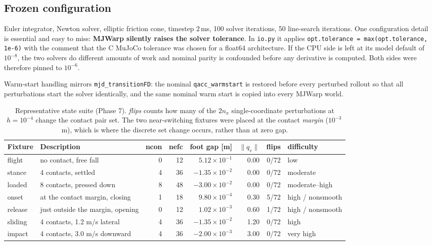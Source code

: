 \documentclass[11pt,a4paper]{article}
\newcommand{\code}[1]{\texttt{\small #1}}
\begin{document}
\subsection{Frozen configuration}
Euler integrator, Newton solver, elliptic friction cone, timestep $2$\,ms, 100 solver
iterations, 50 line-search iterations. One configuration detail is essential and easy to
miss: \textbf{MJWarp silently raises the solver tolerance}. In \code{io.py} it applies
\code{opt.tolerance = max(opt.tolerance, 1e-6)} with the comment that the C MuJoCo tolerance
was chosen for a float64 architecture. If the CPU side is left at its model default of
$10^{-8}$, the two solvers do different amounts of work and nominal parity is confounded
before any derivative is computed. Both sides were therefore pinned to $10^{-6}$.

Warm-start handling mirrors \code{mjd\_transitionFD}: the nominal \code{qacc\_warmstart} is
restored before every perturbed rollout so that all perturbations start the solver
identically, and the same nominal warm start is copied into every MJWarp world.

\begin{table}[htbp]
\centering
\footnotesize
\caption{Representative state suite (Phase 7). \emph{flips} counts how many of the $2n_x$ single-coordinate perturbations at $h=10^{-4}$ change the contact pair set. The two near-switching fixtures were placed at the contact \emph{margin} ($10^{-3}$\,m), which is where the discrete set change occurs, rather than at zero gap.}
\label{tab:fixtures}
\begin{tabular}{llrrrrrl}
\toprule
\textbf{Fixture} & \textbf{Description} & \textbf{ncon} & \textbf{nefc} & \textbf{foot gap [m]} & $\|q_v\|$ & \textbf{flips} & \textbf{difficulty} \\
\midrule
flight & no contact, free fall & 0 & 12 & $5.12\times10^{-1}$ & 0.00 & 0/72 & low \\
stance & 4 contacts, settled & 4 & 36 & $-1.35\times10^{-2}$ & 0.00 & 0/72 & moderate \\
loaded & 8 contacts, pressed down & 8 & 48 & $-3.00\times10^{-2}$ & 0.00 & 0/72 & moderate--high \\
onset & at the contact margin, closing & 1 & 18 & $9.80\times10^{-4}$ & 0.30 & 5/72 & high / nonsmooth \\
release & just outside the margin, opening & 0 & 12 & $1.02\times10^{-3}$ & 0.60 & 1/72 & high / nonsmooth \\
sliding & 4 contacts, 1.2 m/s lateral & 4 & 36 & $-1.35\times10^{-2}$ & 1.20 & 0/72 & high \\
impact & 4 contacts, 3.0 m/s downward & 4 & 36 & $-2.00\times10^{-3}$ & 3.00 & 0/72 & very high \\
\bottomrule
\end{tabular}
\end{table}
\end{document}
